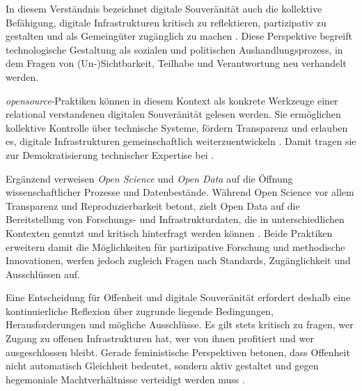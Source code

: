 In diesem Verständnis bezeichnet digitale Souveränität auch die kollektive Befähigung, digitale Infrastrukturen kritisch zu reflektieren, partizipativ zu gestalten und als Gemeingüter zugänglich zu machen \parencite{baackDataficationEmpowermentHow2015,glaszeContestedSpatialitiesDigital2023}. Diese Perspektive begreift technologische Gestaltung als sozialen und politischen Aushandlungsprozess, in dem Fragen von (Un-)Sichtbarkeit, Teilhabe und Verantwortung neu verhandelt werden.

\emph{\gls{opensource}}-Praktiken können in diesem Kontext als konkrete Werkzeuge einer relational verstandenen digitalen Souveränität gelesen werden. Sie ermöglichen kollektive Kontrolle über technische Systeme, fördern Transparenz und erlauben es, digitale Infrastrukturen gemeinschaftlich weiterzuentwickeln \parencite{gurumurthyDataBodiesNew2022}. Damit tragen sie zur Demokratisierung technischer Expertise bei \parencite{baackDataficationEmpowermentHow2015, pohleDigitalSovereignty2020}.

Ergänzend verweisen \emph{Open Science} und \emph{Open Data} auf die Öffnung wissenschaftlicher Prozesse und Datenbestände. Während Open Science vor allem Transparenz und Reproduzierbarkeit betont, zielt Open Data auf die Bereitstellung von Forschungs- und Infrastrukturdaten, die in unterschiedlichen Kontexten genutzt und kritisch hinterfragt werden können \parencite{fecherWhatDrivesAcademic2014}. Beide Praktiken erweitern damit die Möglichkeiten für partizipative Forschung und methodische Innovationen, werfen jedoch zugleich Fragen nach Standards, Zugänglichkeit und Ausschlüssen auf.

Eine Entscheidung für Offenheit und digitale Souveränität erfordert deshalb eine kontinuierliche Reflexion über zugrunde liegende Bedingungen, Herausforderungen und mögliche Ausschlüsse. Es gilt stets kritisch zu fragen, wer Zugang zu offenen Infrastrukturen hat, wer von ihnen profitiert und wer ausgeschlossen bleibt. Gerade feministische Perspektiven betonen, dass Offenheit nicht automatisch Gleichheit bedeutet, sondern aktiv gestaltet und gegen hegemoniale Machtverhältnisse verteidigt werden muss \parencite{wilshireTimeRebootFeminism2024}.
